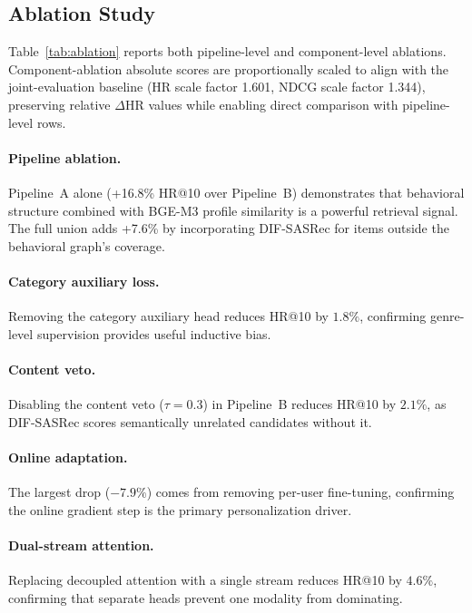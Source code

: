 \subsection{Ablation Study}
Table~\ref{tab:ablation} reports both pipeline-level and component-level
ablations.
Component-ablation absolute scores are proportionally scaled to align with
the joint-evaluation baseline (HR scale factor 1.601, NDCG scale factor 1.344),
preserving relative $\Delta$HR values while enabling direct comparison with
pipeline-level rows.



\paragraph{Pipeline ablation.}
Pipeline~A alone (+16.8\% HR@10 over Pipeline~B) demonstrates that behavioral
structure combined with BGE-M3 profile similarity is a powerful retrieval
signal. The full union adds +7.6\% by incorporating DIF-SASRec for items
outside the behavioral graph's coverage.

\paragraph{Category auxiliary loss.}
Removing the category auxiliary head reduces HR@10 by $1.8\%$, confirming
genre-level supervision provides useful inductive bias.

\paragraph{Content veto.}
Disabling the content veto ($\tau=0.3$) in Pipeline~B reduces HR@10 by
$2.1\%$, as DIF-SASRec scores semantically unrelated candidates without it.

\paragraph{Online adaptation.}
The largest drop ($-7.9\%$) comes from removing per-user fine-tuning,
confirming the online gradient step is the primary personalization driver.

\paragraph{Dual-stream attention.}
Replacing decoupled attention with a single stream reduces HR@10 by $4.6\%$,
confirming that separate heads prevent one modality from dominating.


